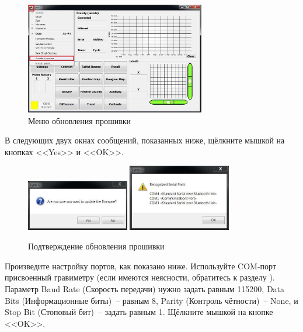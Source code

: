\begin{figure}[H]
  \centering
  \includegraphics[width=0.7\textwidth]{figures/update_firmware_pull-down_menu}
  \caption{Меню обновления прошивки}
  \label{fig:update_firmware_pull-down_menu}
\end{figure}

В следующих двух окнах сообщений, показанных ниже, щёлкните мышкой на
кнопках <<Yes>> и <<OK>>.

\begin{figure}[H]
  \centering
  \includegraphics[width=0.4\textwidth]{figures/confirming_the_firmware_update_1}
  \includegraphics[width=0.4\textwidth]{figures/confirming_the_firmware_update_2}
  \caption{Подтверждение обновления прошивки}
  \label{fig:confirming_the_firmware_update}
\end{figure}

Произведите настройку портов, как показано ниже. Используйте COM-порт
присвоенный гравиметру \cg{} (если имеются неясности, обратитесь к разделу
). Параметр Baud Rate
(Скорость передачи) нужно задать равным 115200, Data Bits (Информационные
биты)~-- равным 8, Parity (Контроль чётности)~-- None, и Stop Bit (Стоповый
бит)~-- задать равным 1. Щёлкните мышкой на кнопке <<OK>>.

